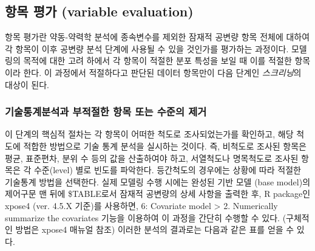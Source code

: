 \documentclass[
  10pt,
]{krantz}
\begin{document}
\hypertarget{uxd56duxbaa9-uxd3c9uxac00-variable-evaluation}{%
\subsection{항목 평가 (variable evaluation)}\label{uxd56duxbaa9-uxd3c9uxac00-variable-evaluation}}

항목 평가란 약동-약력학 분석에 종속변수를 제외한 잠재적 공변량 항목 전체에 대하여 각 항목이 이후 공변량 분석 단계에 사용될 수
있을 것인가를 평가하는 과정이다. 모델링의 목적에 대한 고려 하에서 각 항목이 적절한 분포 특성을 보일 때 이를 적절한 항목이라
한다. 이 과정에서 적절하다고 판단된 데이터 항목만이 다음 단계인 \emph{스크리닝}의 대상이 된다.

\hypertarget{uxae30uxc220uxd1b5uxacc4uxbd84uxc11duxacfc-uxbd80uxc801uxc808uxd55c-uxd56duxbaa9-uxb610uxb294-uxc218uxc900uxc758-uxc81cuxac70}{%
\subsubsection{기술통계분석과 부적절한 항목 또는 수준의 제거}\label{uxae30uxc220uxd1b5uxacc4uxbd84uxc11duxacfc-uxbd80uxc801uxc808uxd55c-uxd56duxbaa9-uxb610uxb294-uxc218uxc900uxc758-uxc81cuxac70}}

이 단계의 핵심적 절차는 각 항목이 어떠한 척도로 조사되었는가를 확인하고, 해당 척도에 적합한 방법으로 기술 통계 분석을 실시하는
것이다. 즉, 비척도로 조사된 항목은 평균, 표준편차, 분위 수 등의 값을 산출하여야 하고, 서열척도나 명목척도로 조사된 항목은
각 수준(level) 별로 빈도를 파악한다. 등간척도의 경우에는 상황에 따라 적절한 기술통계 방법을 선택한다. 실제 모델링
수행 시에는 완성된 기반 모델 (base model)의 제어구문 맨 뒤에 \$TABLE로서 잠재적 공변량의 상세 사항을
출력한 후, R package인 xpose4 (ver. 4.5.X 기준)를 사용하면, 6: Covariate model
\textgreater{} 2. Numerically summarize the covariates 기능을 이용하여 이 과정을 간단히 수행할 수 있다.
(구체적인 방법은 xpose4 매뉴얼 참조) 이러한 분석의 결과로는 다음과 같은 표를 얻을 수 있다.
\end{document}
